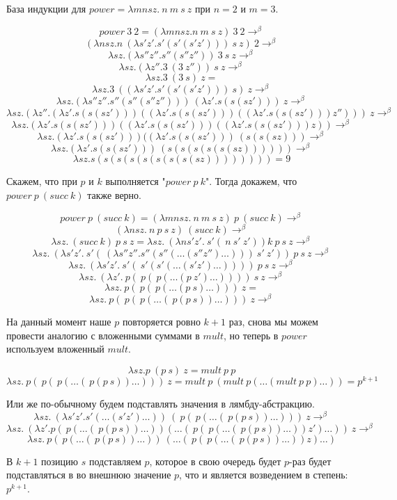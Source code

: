 \documentclass[a4paper,12pt]{article}
\theoremstyle{plain} %
\theoremstyle{definition} %
\theoremstyle{remark} %
\begin{document}
База индукции для $power = \lambda m n s z. \ n \ m \ s \ z$ при $n = 2$ и $m = 3$.

$$power \ 3 \ 2 = (\lambda m n s z. n \ m \ s \ z) \ 3 \ 2 \rightarrow^{\beta}$$
$$(\lambda n s z. n \ (\lambda s'z'. s'(s'(s'z'))) \ s \ z) \ 2 \rightarrow^{\beta}$$
$$\lambda s z. (\lambda s''z''. s''(s''z'')) \ 3 \ s \ z \rightarrow^{\beta}$$
$$\lambda s z. (\lambda z''. 3 \ (3 \ z'')) \ s \ z \rightarrow^{\beta}$$
$$\lambda s z. 3 \ (3 \ s) \ z =$$
$$\lambda s z. 3 \ ((\lambda s'z'. s'(s'(s'z'))) \ s) \ z \rightarrow^{\beta}$$
$$\lambda s z. (\lambda s''z''. s''(s''(s''z''))) \ (\lambda z'. s(s(sz'))) \ z \rightarrow^{\beta}$$
$$\lambda s z. (\lambda z''. (\lambda z'. s(s(sz')))((\lambda z'. s(s(sz')))((\lambda z'. s(s(sz')))z''))) \ z \rightarrow^{\beta}$$
$$\lambda s z. (\lambda z'. s(s(sz')))((\lambda z'. s(s(sz')))((\lambda z'. s(s(sz')))z)) \rightarrow^{\beta}$$
$$\lambda s z. (\lambda z'. s(s(sz')))((\lambda z'. s(s(sz'))) \ (s(s(sz))) \rightarrow^{\beta}$$
$$\lambda s z. (\lambda z'. s(s(sz'))) \ (s(s(s(s(s(sz)))))) \rightarrow^{\beta}$$
$$\lambda s z. s(s(s(s(s(s(s(s(sz)))))))) = 9$$

Скажем, что при $p$ и $k$ выполняется "$power \ p \ k$". Тогда докажем, что $power \ p \ (succ \ k)$ также верно.

$$power \ p \ (succ \ k) = (\lambda m n s z. \ n \ m \ s \ z) \ p \ (succ \ k) \rightarrow^{\beta}$$
$$(\lambda n s z. \ n \ p \ s \ z) \ (succ \ k) \rightarrow^{\beta}$$
$$\lambda s z. \ (succ \ k) \ p \ s \ z = \lambda s z. \ (\lambda ns'z'. \ s'(\ n \ s' \ z')) k \ p \ s \ z  \rightarrow^{\beta}$$
$$\lambda s z. \ (\lambda s'z'. \ s'(\ (\lambda s''z''. s''(s''(\dots (s''z'') \dots))) \ s' \ z')) \ p \ s \ z  \rightarrow^{\beta}$$
$$\lambda s z. \ (\lambda s'z'. \ s'(\ s'(s'(\dots (s'z') \dots)))) \ p \ s \ z  \rightarrow^{\beta}$$
$$\lambda s z. \ (\lambda z'. \ p(\ p( \ p(\dots (p \ z') \dots)))) \ s \ z  \rightarrow^{\beta}$$
$$\lambda s z. \ p(\ p( \ p(\dots (p \ s) \dots))) \ z  =$$
$$\lambda s z. \ p(\ p( \ p(\dots (\ p(p \ s)) \dots))) \ z  \rightarrow^{\beta}$$

На данный момент наше $p$ повторяется ровно $k + 1$ раз, снова мы можем провести аналогию с вложенными суммами в $mult$, но теперь в $power$ используем вложенный $mult$.

$$\lambda sz. p \ (p \ s) \ z = mult \ p \ p$$
$$\lambda s z. \ p(\ p( \ p(\dots (\ p(p \ s)) \dots))) \ z  = mult \ p \ (mult \ p (\dots (mult \ p \ p) \dots)) = p^{k+1}$$

Или же по-обычному будем подставлять значения в лямбду-абстракцию.
$$\lambda s z. \ (\lambda s'z'. s'(\dots (s'z') \dots)) \ (\ p( \ p(\dots (\ p(p \ s)) \dots))) \ z \rightarrow^{\beta}$$
$$\lambda s z. \ (\lambda z'. p( \ p(\dots (\ p(p \ s)) \dots))(\dots (\ p( \ p(\dots (\ p(p \ s)) \dots))z') \dots)) \ z \rightarrow^{\beta}$$
$$\lambda s z. \ p( \ p(\dots (\ p(p \ s)) \dots)) \ (\dots (\ p( \ p(\dots (\ p(p \ s)) \dots))z) \dots)$$

В $k+1$ позицию $s$ подставляем $p$, которое в свою очередь будет $p$-раз будет подставляться в во внешнюю значение $p$, что и является возведением в степень: $p^{k+1}$.
\end{document}
